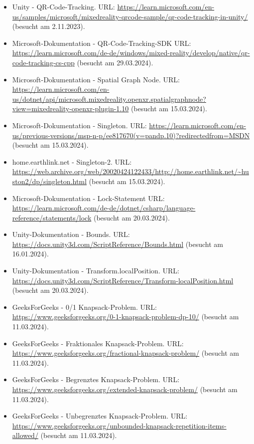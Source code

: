 \begin{itemize}[leftmargin=0pt]
    \item Unity - QR-Code-Tracking. {\scriptsize URL:} \url{https://learn.microsoft.com/en-us/samples/microsoft/mixedreality-qrcode-sample/qr-code-tracking-in-unity/} (besucht am 2.11.2023).
    \item Microsoft-Dokumentation - QR-Code-Tracking-SDK {\scriptsize URL:} \url{https://learn.microsoft.com/de-de/windows/mixed-reality/develop/native/qr-code-tracking-cs-cpp} (besucht am 29.03.2024).
    \item Microsoft-Dokumentation - Spatial Graph Node. {\scriptsize URL:} \url{https://learn.microsoft.com/en-us/dotnet/api/microsoft.mixedreality.openxr.spatialgraphnode?view=mixedreality-openxr-plugin-1.10} (besucht am 15.03.2024).
    \item Microsoft-Dokumentation - Singleton. {\scriptsize URL:} \url{https://learn.microsoft.com/en-us/previous-versions/msp-n-p/ee817670(v=pandp.10)?redirectedfrom=MSDN} (besucht am 15.03.2024).
    \item home.earthlink.net - Singleton-2. {\scriptsize URL:} \url{https://web.archive.org/web/20020424122433/http://home.earthlink.net/~huston2/dp/singleton.html} (besucht am 15.03.2024).
    \item Microsoft-Dokumentation - Lock-Statement {\scriptsize URL:} \url{https://learn.microsoft.com/de-de/dotnet/csharp/language-reference/statements/lock} (besucht am 20.03.2024).
    \item Unity-Dokumentation - Bounds. {\scriptsize URL:} \url{https://docs.unity3d.com/ScriptReference/Bounds.html} (besucht am 16.01.2024).
    \item Unity-Dokumentation - Transform.localPosition. {\scriptsize URL:} \url{https://docs.unity3d.com/ScriptReference/Transform-localPosition.html} (besucht am 20.03.2024).
    \item GeeksForGeeks - 0/1 Knapsack-Problem. {\scriptsize URL:} \url{https://www.geeksforgeeks.org/0-1-knapsack-problem-dp-10/} (besucht am 11.03.2024).
    \item GeeksForGeeks - Fraktionales Knapsack-Problem. {\scriptsize URL:} \url{https://www.geeksforgeeks.org/fractional-knapsack-problem/} (besucht am 11.03.2024).
    \item GeeksForGeeks - Begrenztes Knapsack-Problem. {\scriptsize URL:} \url{https://www.geeksforgeeks.org/extended-knapsack-problem/} (besucht am 11.03.2024).
    \item GeeksForGeeks - Unbegrenztes Knapsack-Problem. {\scriptsize URL:} \url{https://www.geeksforgeeks.org/unbounded-knapsack-repetition-items-allowed/} (besucht am 11.03.2024).

\end{itemize}

